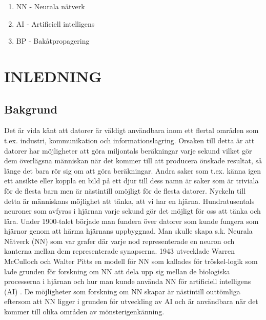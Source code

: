 \documentclass[a4paper,10pt]{article}
\begin{document}
\begin{enumerate}[noitemsep]
\item NN - Neurala nätverk
\item AI - Artificiell intelligens
\item BP - Bakåtpropagering
\end{enumerate}

\section{INLEDNING}





\subsection{Bakgrund}

Det är vida känt att datorer är väldigt användbara inom ett flertal områden som t.ex. industri, kommunikation och informationslagring. Orsaken till detta är att datorer har möjligheter att göra miljontals beräkningar varje sekund vilket gör dem överlägsna människan när det kommer till att producera önskade resultat, så länge det bara rör sig om att göra beräkningar. Andra saker som t.ex. känna igen ett ansikte eller koppla en bild på ett djur till dess namn är saker som är triviala för de flesta barn men är nästintill omöjligt för de flesta datorer. Nyckeln till detta är människans möjlighet att tänka, att vi har en hjärna. Hundratusentals neuroner som avfyras i hjärnan varje sekund gör det möjligt för oss att tänka och lära. Under 1900-talet började man fundera över datorer som kunde fungera som hjärnor genom att härma hjärnans uppbyggnad. Man skulle skapa s.k. Neurala Nätverk (NN) som var grafer där varje nod representerade en neuron och kanterna mellan dem representerade synapserna. 1943 utvecklade Warren McCulloch och Walter Pitts en modell för NN som kallades för tröskel-logik som lade grunden för forskning om NN att dela upp sig mellan de biologiska processerna i hjärnan och hur man kunde använda NN för artificiell intelligens (AI) \autocite{NNhistory}. De möjligheter som forskning om NN skapar är nästintill outtömliga eftersom att NN ligger i grunden för utveckling av AI och är användbara när det kommer till olika områden av mönsterigenkänning.
\end{document}
